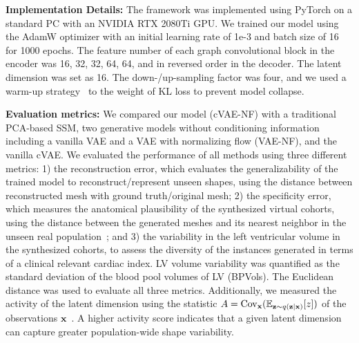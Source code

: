 \documentclass[runningheads]{llncs}
\begin{document}
\textbf{Implementation Details:} The framework was implemented using PyTorch on a standard PC with an NVIDIA RTX 2080Ti GPU. We trained our model using the AdamW optimizer with an initial learning rate of 1e-3 and batch size of 16 for 1000 epochs. The feature number of each graph convolutional block in the encoder was 16, 32, 32, 64, 64, and in reversed order in the decoder. The latent dimension was set as 16. The down-/up-sampling factor was four, and we used a warm-up strategy~\cite{sonderby2016ladder} to the weight of KL loss to prevent model collapse.

\textbf{Evaluation metrics:} We compared our model (cVAE-NF) with a traditional PCA-based SSM, two generative models without conditioning information including a vanilla VAE and a VAE with normalizing flow (VAE-NF), and the vanilla cVAE. We evaluated the performance of all methods using three different metrics: 1) the reconstruction error, which evaluates the generalizability of the trained model to reconstruct/represent unseen shapes, using the distance between reconstructed mesh with ground truth/original mesh; 2) the specificity error, which measures the anatomical plausibility of the synthesized virtual cohorts, using the distance between the generated meshes and its nearest neighbor in the unseen real population~\cite{davies2009building}; and 3) the variability in the left ventricular volume in the synthesized cohorts, to assess the diversity of the instances generated in terms of a clinical relevant cardiac index. LV volume variability was quantified as the standard deviation of the blood pool volumes of LV (BPVols). The Euclidean distance was used to evaluate all three metrics. Additionally, we measured the activity of the latent dimension using the statistic $A = {\rm Cov}_{\textbf{x}}(\mathbb{E}_{\textbf{z}\sim q(\textbf{z} \vert \textbf{x})} [z])$ of the observations $\textbf{x}$~\cite{burda2015importance}. A higher activity score indicates that a given latent dimension can capture greater population-wide shape variability.
\end{document}
